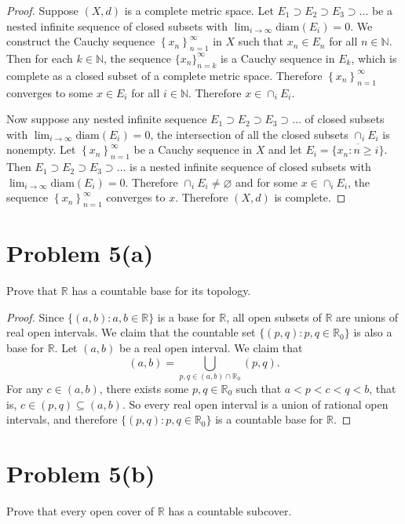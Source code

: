 \documentclass[12pt]{article}
\newenvironment{problem}
    {\begin{lrbox}{\mybox}\begin{minipage}{\textwidth-10pt}}
    {\end{minipage}\end{lrbox}\framebox[6.5in]{\usebox{\mybox}}}
\newcommand{\seq}[2]{\left\{#1\right\}_{#2=1}^\infty}
\newcommand{\clo}[1]{\overline{#1}}
\newcommand{\N}{\mathbb{N}}
\newcommand{\R}{\mathbb{R}}
\let\emptyset\varnothing
\newcommand{\diam}{\text{diam}}
\begin{document}
\begin{proof}
    Suppose $(X,d)$ is a complete metric space. Let $E_1 \supset E_2 \supset E_3 \supset \dots$ be a nested infinite sequence of closed subsets with $\lim_{i\to\infty} \diam(E_i) = 0$. We construct the Cauchy sequence $\seq{x_n}{n}$ in $X$ such that $x_n\in E_n$ for all $n\in\N$. Then for each $k\in\N$, the sequence $\{x_n\}_{n=k}^\infty$ is a Cauchy sequence in $E_k$, which is complete as a closed subset of a complete metric space. Therefore $\seq{x_n}{n}$ converges to some $x\in E_i$ for all $i\in\N$. Therefore $x\in\cap_iE_i$.
    
    Now suppose any nested infinite sequence $E_1 \supset E_2 \supset E_3 \supset \dots$ of closed subsets with $\lim_{i\to\infty} \diam(E_i) = 0$, the intersection of all the closed subsets $\cap_iE_i$ is nonempty. Let $\seq{x_n}{n}$ be a Cauchy sequence in $X$ and let $E_i=\clo{\{x_n : n\geq i\}}$. Then $E_1 \supset E_2 \supset E_3 \supset \dots$ is a nested infinite sequence of closed subsets with $\lim_{i\to\infty} \diam(E_i) = 0$. Therefore $\cap_iE_i\ne\emptyset$ and for some $x\in\cap_iE_i$, the sequence $\seq{x_n}{n}$ converges to $x$. Therefore $(X,d)$ is complete.
    
\end{proof}

\newpage
\section*{Problem 5(a)}
\begin{problem}
    Prove that $\R$ has a countable base for its topology.
\end{problem}

\begin{proof}
    Since $\{(a,b) : a,b\in\R\}$ is a base for $\R$, all open subsets of $\R$ are unions of real open intervals. We claim that the countable set $\{(p,q) : p,q\in\R_0\}$ is also a base for $\R$. Let $(a,b)$ be a real open interval. We claim that
    \[(a,b) = \bigcup_{p,q\in(a,b)\cap\R_0}(p,q).\]
    For any $c\in(a,b)$, there exists some $p,q\in\R_0$ such that $a<p<c<q<b$, that is, $c\in(p,q)\subseteq(a,b)$. So every real open interval is a union of rational open intervals, and therefore $\{(p,q) : p,q\in\R_0\}$ is a countable base for $\R$.
    
\end{proof}

\section*{Problem 5(b)}
\begin{problem}
    Prove that every open cover of $\R$ has a countable subcover.
\end{problem}
\end{document}
